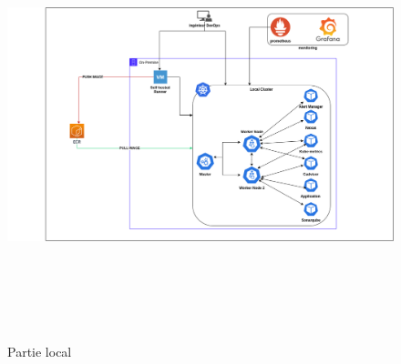 \begin{figure}[H]
\centering
\includegraphics[width=15cm,height=12.5cm]{LOCAL.drawio.png}

  \caption{Partie local}
\end{figure}

